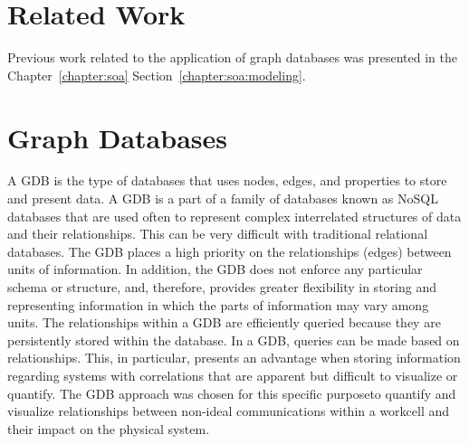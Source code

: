 \section{Related Work}
Previous work related to the application of graph databases was presented in the Chapter~\ref{chapter:soa} Section~\ref{chapter:soa:modeling}.

\section{Graph Databases}
A GDB is the type of databases that uses nodes, edges, and properties to store and present data. A GDB is a part of a family of databases known as NoSQL databases that are used often to represent complex interrelated structures of data and their relationships.  This can be very difficult with traditional relational databases.  The GDB places a high priority on the relationships (edges) between units of information.  In addition, the GDB does not enforce any particular schema or structure, and, therefore, provides greater flexibility in storing and representing information in which the parts of information may vary among units. The relationships within a GDB are efficiently queried because they are persistently stored within the database.  In a GDB, queries can be made based on relationships. This, in particular, presents an advantage when storing information regarding systems with correlations that are apparent but difficult to visualize or quantify. The GDB approach was chosen for this specific purpose\textemdash{}to quantify and visualize relationships between non-ideal communications within a workcell and their impact on the physical system.

